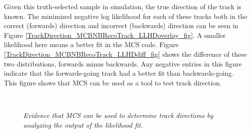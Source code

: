 Given this truth-selected sample in simulation, the true direction of the track is known. The minimized negative log likelihood for each of these tracks both in the correct (forwards) direction and incorrect (backwards) direction can be seen in Figure \ref{TrackDirection_MCBNBRecoTrack_LLHDoverlay_fig}. A smaller likelihood here means a better fit in the MCS code. Figure \ref{TrackDirection_MCBNBRecoTrack_LLHDdiff_fig} shows the difference of these two distributions, forwards minus backwards. Any negative entries in this figure indicate that the forwards-going track had a better fit than backwards-going. This figure shows that MCS can be used as a tool to test track direction.

\begin{figure}
\centering
\mbox{
	\quad
	}
\caption{\textit{Evidence that MCS can be used to determine track directions by analyzing the output of the likelihood fit.}}
\end{figure}

